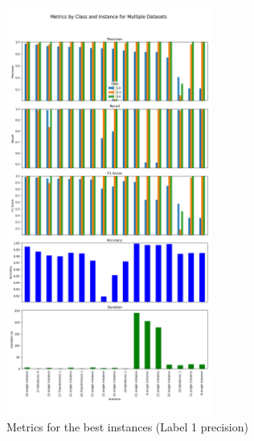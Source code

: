 \begin{figure}[ht]
    \centering
    \includegraphics[width=0.6\textwidth]{img/annexes/Best 1.0 Precision (by instances).png}
    \caption{Metrics for the best instances (Label 1 precision)}
    \label{fig:results:best_label_1_precision_instances}
\end{figure}

